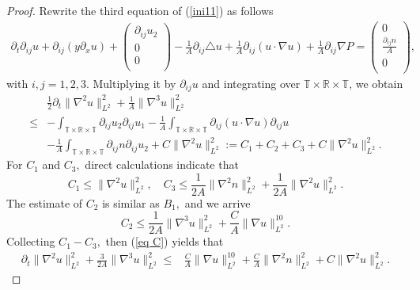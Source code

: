 \documentclass[12pt, reqno]{amsart}
\numberwithin{equation}{section}
\begin{document}
\begin{proof}
	Rewrite the third equation of (\ref{ini11}) as follows	
	\begin{equation*}
		\begin{aligned}
		\partial_{t}\partial_{ij}u+\partial_{ij}(y\partial_{x}u)+\left(
		\begin{array}{c}
		\partial_{ij}u_{2} \\
		0 \\
		0 \\
		\end{array}
		\right)-\frac{1}{A}\partial_{ij}\triangle u+\frac{1}{A}\partial_{ij}(u\cdot\nabla u)+\frac{1}{A}\partial_{ij}\nabla P=\left(
		\begin{array}{c}
		0 \\
		\frac{\partial_{ij}n}{A} \\
		0 \\
		\end{array}
		\right),
		\end{aligned}
	\end{equation*}
	with $ i,j=1,2,3. $ Multiplying it by $ \partial_{ij}u $ and integrating 
	over $ \mathbb{T}\times\mathbb{R}\times\mathbb{T} $, we obtain
	\begin{equation}\label{eq C}
		\begin{aligned}
		&\frac12\partial_{t}\|\nabla^{2}u\|_{L^{2}}^{2}+\frac{1}{A}\|\nabla^{3}u\|_{L^{2}}^{2}\\\leq &-\int_{\mathbb{T}\times\mathbb{R}\times\mathbb{T}}\partial_{ij}u_{2}\partial_{ij}u_{1}-\frac{1}{A}\int_{\mathbb{T}\times\mathbb{R}\times\mathbb{T}}\partial_{ij}(u\cdot\nabla u)\partial_{ij }u\\&-\frac{1}{A}\int_{\mathbb{T}\times\mathbb{R}\times\mathbb{T}}\partial_{ij}n\partial_{ij}u_{2}+C\|\nabla^{2}u\|_{L^{2}}^{2}:=C_{1}+C_{2}+C_{3}+C\|\nabla^{2}u\|_{L^{2}}^{2}.
		\end{aligned}
	\end{equation}
	For $ C_{1} $ and $ C_{3}, $  direct calculations indicate that
	\begin{equation*}
		C_{1}\leq \|\nabla^{2}u\|_{L^{2}}^{2},\quad C_{3}\leq\frac{1}{2A}\|\nabla^{2}n\|_{L^{2}}^{2}+\frac{1}{2A}\|\nabla^{2}u\|_{L^{2}}^{2}.
	\end{equation*}
	The estimate of $ C_{2} $ is similar as $ B_{1}, $ and we arrive
	\begin{equation*}
		C_{2}\leq \frac{1}{2A}\|\nabla^{3}u\|_{L^{2}}^{2}+\frac{C}{A}\|\nabla u\|_{L^{2}}^{10}.
	\end{equation*}	
		Collecting $ C_{1}-C_{3}, $ then (\ref{eq C}) yields that
		\begin{equation}\label{u''}
			\begin{aligned}
			\partial_{t}\|\nabla^{2}u\|_{L^{2}}^{2}+\frac{3}{2A}\|\nabla^{3}u\|_{L^{2}}^{2}\leq&\frac{C}{A}\|\nabla u\|_{L^{2}}^{10}+\frac{C}{A}\|\nabla^{2}n\|_{L^{2}}^{2}+C\|\nabla^{2}u\|_{L^{2}}^{2}.
			\end{aligned}
		\end{equation}
		

\end{proof}
\end{document}
